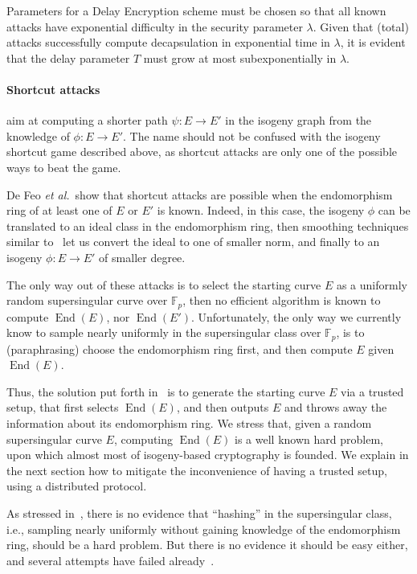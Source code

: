 \documentclass{llncs}
\newcommand{\F}{\mathbb{F}}
\DeclareMathOperator{\End}{End}
\begin{document}
Parameters for a Delay Encryption scheme must be chosen so that all
known attacks have exponential difficulty in the security parameter
$\lambda$. %
Given that (total) attacks successfully compute decapsulation in
exponential time in $\lambda$, it is evident that the delay parameter
$T$ must grow at most subexponentially in $\lambda$.

\paragraph{Shortcut attacks} aim at computing a shorter path
$\psi:E\to E'$ in the isogeny graph from the knowledge of
$\phi:E\to E'$. %
The name should not be confused with the isogeny shortcut game
described above, as shortcut attacks are only one of the possible ways
to beat the game.

De Feo \emph{et al.}\ show that shortcut attacks are possible when the
endomorphism ring of at least one of $E$ or $E'$ is known. %
Indeed, in this case, the isogeny $\phi$ can be translated to an ideal
class in the endomorphism ring, then smoothing techniques similar
to~\cite{kohel2014quaternion} let us convert the ideal to one of
smaller norm, and finally to an isogeny $\phi:E\to E'$ of smaller
degree.

The only way out of these attacks is to select the starting curve $E$
as a uniformly random supersingular curve over $\F_p$, then no
efficient algorithm is known to compute $\End(E)$, nor $\End(E')$. %
Unfortunately, the only way we currently know to sample nearly
uniformly in the supersingular class over $\F_p$, is to
(paraphrasing) choose the endomorphism ring first, and then compute
$E$ given $\End(E)$.

Thus, the solution put forth in~\cite{10.1007/978-3-030-34578-5_10} is
to generate the starting curve $E$ via a trusted setup, that first
selects $\End(E)$, and then outputs $E$ and throws away the
information about its endomorphism ring. %
We stress that, given a random supersingular curve $E$, computing
$\End(E)$ is a well known hard problem, upon which almost most of
isogeny-based cryptography is founded. %
We explain in the next section how to mitigate the inconvenience of
having a trusted setup, using a distributed protocol.

As stressed in~\cite{10.1007/978-3-030-34578-5_10}, there is no
evidence that ``hashing'' in the supersingular class, i.e., sampling
nearly uniformly without gaining knowledge of the endomorphism ring,
should be a hard problem. %
But there is no evidence it should be easy either, and several
attempts have failed
already~\cite{cryptoeprint:2019:1202,love2019supersingular}.
\end{document}
